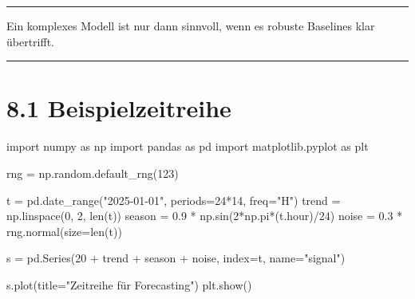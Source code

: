 \documentclass[
  ngerman,
  letterpaper,
  DIV=11]{scrreprt}
\newenvironment{Shaded}{\begin{snugshade}}{\end{snugshade}}
\newcommand{\BuiltInTok}[1]{\textcolor[rgb]{0.00,0.23,0.31}{#1}}
\newcommand{\DecValTok}[1]{\textcolor[rgb]{0.68,0.00,0.00}{#1}}
\newcommand{\FloatTok}[1]{\textcolor[rgb]{0.68,0.00,0.00}{#1}}
\newcommand{\ImportTok}[1]{\textcolor[rgb]{0.00,0.46,0.62}{#1}}
\newcommand{\NormalTok}[1]{\textcolor[rgb]{0.00,0.23,0.31}{#1}}
\newcommand{\OperatorTok}[1]{\textcolor[rgb]{0.37,0.37,0.37}{#1}}
\newcommand{\StringTok}[1]{\textcolor[rgb]{0.13,0.47,0.30}{#1}}
\begin{document}
\begin{center}\rule{0.5\linewidth}{0.5pt}\end{center}

\begin{tcolorbox}[enhanced jigsaw, titlerule=0mm, title=\textcolor{quarto-callout-note-color}{\faInfo}\hspace{0.5em}{Merke}, bottomrule=.15mm, opacityback=0, colbacktitle=quarto-callout-note-color!10!white, coltitle=black, opacitybacktitle=0.6, colframe=quarto-callout-note-color-frame, toprule=.15mm, leftrule=.75mm, arc=.35mm, rightrule=.15mm, breakable, bottomtitle=1mm, colback=white, toptitle=1mm, left=2mm]

Ein komplexes Modell ist nur dann sinnvoll, wenn es robuste Baselines
klar übertrifft.

\end{tcolorbox}

\begin{center}\rule{0.5\linewidth}{0.5pt}\end{center}

\section{8.1 Beispielzeitreihe}\label{beispielzeitreihe}

\begin{Shaded}
\begin{Highlighting}[]
\ImportTok{import}\NormalTok{ numpy }\ImportTok{as}\NormalTok{ np}
\ImportTok{import}\NormalTok{ pandas }\ImportTok{as}\NormalTok{ pd}
\ImportTok{import}\NormalTok{ matplotlib.pyplot }\ImportTok{as}\NormalTok{ plt}

\NormalTok{rng }\OperatorTok{=}\NormalTok{ np.random.default\_rng(}\DecValTok{123}\NormalTok{)}

\NormalTok{t }\OperatorTok{=}\NormalTok{ pd.date\_range(}\StringTok{"2025{-}01{-}01"}\NormalTok{, periods}\OperatorTok{=}\DecValTok{24}\OperatorTok{*}\DecValTok{14}\NormalTok{, freq}\OperatorTok{=}\StringTok{"H"}\NormalTok{)}
\NormalTok{trend }\OperatorTok{=}\NormalTok{ np.linspace(}\DecValTok{0}\NormalTok{, }\DecValTok{2}\NormalTok{, }\BuiltInTok{len}\NormalTok{(t))}
\NormalTok{season }\OperatorTok{=} \FloatTok{0.9} \OperatorTok{*}\NormalTok{ np.sin(}\DecValTok{2}\OperatorTok{*}\NormalTok{np.pi}\OperatorTok{*}\NormalTok{(t.hour)}\OperatorTok{/}\DecValTok{24}\NormalTok{)}
\NormalTok{noise }\OperatorTok{=} \FloatTok{0.3} \OperatorTok{*}\NormalTok{ rng.normal(size}\OperatorTok{=}\BuiltInTok{len}\NormalTok{(t))}

\NormalTok{s }\OperatorTok{=}\NormalTok{ pd.Series(}\DecValTok{20} \OperatorTok{+}\NormalTok{ trend }\OperatorTok{+}\NormalTok{ season }\OperatorTok{+}\NormalTok{ noise, index}\OperatorTok{=}\NormalTok{t, name}\OperatorTok{=}\StringTok{"signal"}\NormalTok{)}

\NormalTok{s.plot(title}\OperatorTok{=}\StringTok{"Zeitreihe für Forecasting"}\NormalTok{)}
\NormalTok{plt.show()}
\end{Highlighting}
\end{Shaded}
\end{document}
